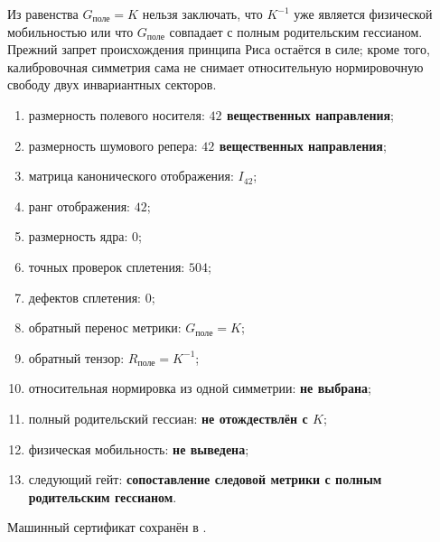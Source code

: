 \begin{nogocriterion}
Из равенства $G_{\text{поле}}=K$ нельзя заключать, что $K^{-1}$ уже является
физической мобильностью или что $G_{\text{поле}}$ совпадает с полным
родительским гессианом. Прежний запрет происхождения принципа Риса остаётся
в силе; кроме того, калибровочная симметрия сама не снимает относительную
нормировочную свободу двух инвариантных секторов.
\end{nogocriterion}

\begin{protocol}
\begin{enumerate}
 \item размерность полевого носителя: \textbf{$42$ вещественных направления};
 \item размерность шумового репера: \textbf{$42$ вещественных направления};
 \item матрица канонического отображения: \textbf{$I_{42}$};
 \item ранг отображения: \textbf{$42$};
 \item размерность ядра: \textbf{$0$};
 \item точных проверок сплетения: \textbf{$504$};
 \item дефектов сплетения: \textbf{$0$};
 \item обратный перенос метрики: \textbf{$G_{\text{поле}}=K$};
 \item обратный тензор: \textbf{$R_{\text{поле}}=K^{-1}$};
 \item относительная нормировка из одной симметрии: \textbf{не выбрана};
 \item полный родительский гессиан: \textbf{не отождествлён с $K$};
 \item физическая мобильность: \textbf{не выведена};
 \item следующий гейт: \textbf{сопоставление следовой метрики с полным
       родительским гессианом}.
\end{enumerate}
\end{protocol}

Машинный сертификат сохранён в
.